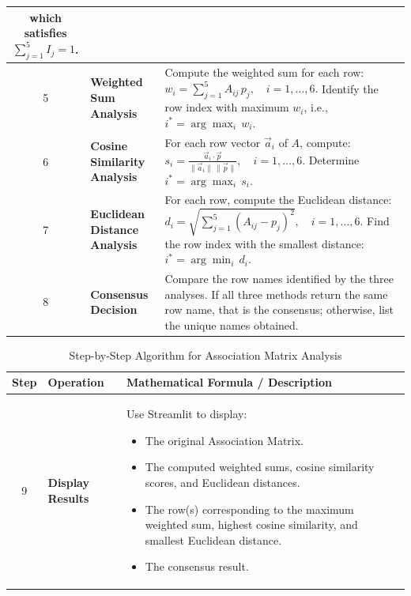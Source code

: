 \begin{table}[H]
\begin{tabularx}{\textwidth}{|c|p{6cm}|>{\raggedright\arraybackslash}X|}
    which satisfies \( \displaystyle \sum_{j=1}^{5} I_j = 1 \).\newline \\ \hline
    5 & \textbf{Weighted Sum Analysis} & Compute the weighted sum for each row: 
    \( \displaystyle w_i = \sum_{j=1}^{5} A_{ij}\, p_j, \quad i=1,\dots,6. \)
    Identify the row index with maximum \(w_i\), i.e., \( \displaystyle i^* = \arg\max_{i}\, w_i. \) \\ \hline
    6 & \textbf{Cosine Similarity Analysis} & For each row vector \( \vec{a}_i \) of \(A\), compute:
    \( \displaystyle s_i = \frac{\vec{a}_i \cdot \vec{p}}{\|\vec{a}_i\|\,\|\vec{p}\|}, \quad i=1,\dots,6. \)
    Determine \( \displaystyle i^* = \arg\max_{i}\, s_i. \) \\ \hline
    7 & \textbf{Euclidean Distance Analysis} & For each row, compute the Euclidean distance:
    \( \displaystyle d_i = \sqrt{\sum_{j=1}^{5} \left(A_{ij} - p_j\right)^2}, \quad i=1,\dots,6. \)
    Find the row index with the smallest distance:
    \( \displaystyle i^* = \arg\min_{i}\, d_i. \) \newline \\ \hline
    8 & \textbf{Consensus Decision} & Compare the row names identified by the three analyses. If all three methods return the same row name, that is the consensus; otherwise, list the unique names obtained. \\ \hline
\end{tabularx}
\end{table}

\begin{table}[H]
    \centering
    \caption*{Step-by-Step Algorithm for Association Matrix Analysis}
    \label{tab:algorithm}
    \begin{tabularx}{\textwidth}{|c|p{6cm}|>{\raggedright\arraybackslash}X|}
    \hline
    \textbf{Step} & \textbf{Operation} & \textbf{Mathematical Formula / Description} \\ \hline
    9 & \textbf{Display Results} & Use Streamlit to display:
    \begin{itemize}[noitemsep, topsep=0pt]
        \item The original Association Matrix.
        \item The computed weighted sums, cosine similarity scores, and Euclidean distances.
        \item The row(s) corresponding to the maximum weighted sum, highest cosine similarity, and smallest Euclidean distance.
        \item The consensus result.
    \end{itemize} \\ \hline
    \end{tabularx}
\end{table}

